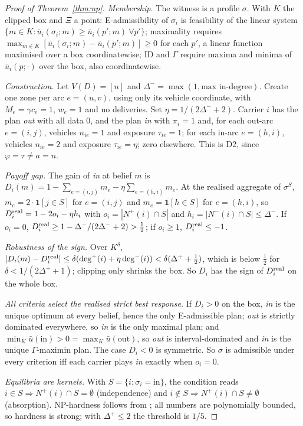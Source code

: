 \documentclass[preprint,12pt]{elsarticle}
\theoremstyle{definition}
\theoremstyle{remark}
\newcommand{\ub}{\bar u}
\begin{document}
\begin{proof}[Proof of Theorem~\ref{thm:np}]
\emph{Membership.} The witness is a profile $\sigma$. With $K$ the clipped box and $\Xi$ a point: E-admissibility of $\sigma_i$ is feasibility of the linear system $\{m\in K:\ub_i(\sigma_i;m)\ge\ub_i(p';m)\ \forall p'\}$; maximality requires $\max_{m\in K}[\ub_i(\sigma_i;m)-\ub_i(p';m)]\ge0$ for each $p'$, a linear function maximised over a box coordinatewise; ID and $\Gamma$ require maxima and minima of $\ub_i(p;\cdot)$ over the box, also coordinatewise.

\emph{Construction.} Let $V(D)=[n]$ and $\Delta^-=\max(1,\text{max in-degree})$. Create one zone per arc $e=(u,v)$, using only its vehicle coordinate, with $M_e=\gamma c_e=1$, $w_e=1$ and no deliveries. Set $\eta=1/(2\Delta^-+2)$. Carrier $i$ has the plan \emph{out} with all data $0$, and the plan \emph{in} with $\pi_i=1$ and, for each out-arc $e=(i,j)$, vehicles $n_{ie}=1$ and exposure $\tau_{ie}=1$; for each in-arc $e=(h,i)$, vehicles $n_{ie}=2$ and exposure $\tau_{ie}=\eta$; zero elsewhere. This is D2, since $\varphi=\tau\ne a=n$.

\emph{Payoff gap.} The gain of \emph{in} at belief $m$ is $D_i(m)=1-\sum_{e=(i,j)}m_e-\eta\sum_{e=(h,i)}m_e$. At the realised aggregate of $\sigma^S$, $m_e=2\cdot\mathbf 1[j\in S]$ for $e=(i,j)$ and $m_e=\mathbf 1[h\in S]$ for $e=(h,i)$, so $D_i^{\rm real}=1-2o_i-\eta h_i$ with $o_i=|N^+(i)\cap S|$ and $h_i=|N^-(i)\cap S|\le\Delta^-$. If $o_i=0$, $D_i^{\rm real}\ge1-\Delta^-/(2\Delta^-+2)>\tfrac12$; if $o_i\ge1$, $D_i^{\rm real}\le-1$.

\emph{Robustness of the sign.} Over $K^\delta$, $|D_i(m)-D_i^{\rm real}|\le\delta(\deg^+(i)+\eta\deg^-(i))<\delta(\Delta^++\tfrac12)$, which is below $\tfrac12$ for $\delta<1/(2\Delta^++1)$; clipping only shrinks the box. So $D_i$ has the sign of $D_i^{\rm real}$ on the whole box.

\emph{All criteria select the realised strict best response.} If $D_i>0$ on the box, \emph{in} is the unique optimum at every belief, hence the only E-admissible plan; \emph{out} is strictly dominated everywhere, so \emph{in} is the only maximal plan; and $\min_K\ub(\text{in})>0=\max_K\ub(\text{out})$, so \emph{out} is interval-dominated and \emph{in} is the unique $\Gamma$-maximin plan. The case $D_i<0$ is symmetric. So $\sigma$ is admissible under every criterion iff each carrier plays \emph{in} exactly when $o_i=0$.

\emph{Equilibria are kernels.} With $S=\{i:\sigma_i=\text{in}\}$, the condition reads $i\in S\Rightarrow N^+(i)\cap S=\emptyset$ (independence) and $i\notin S\Rightarrow N^+(i)\cap S\ne\emptyset$ (absorption). NP-hardness follows from \citet{Chvatal1973}; all numbers are polynomially bounded, so hardness is strong; with $\Delta^+\le2$ \citep{Fraenkel1981} the threshold is $1/5$.
\end{proof}
\end{document}
